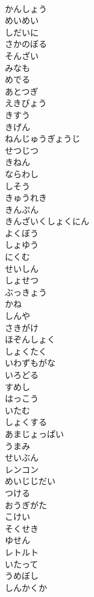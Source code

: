 \documentclass[8pt]{extreport}
\begin{document}
\begin{CJK}{UTF8}{min}
\\	かんしょう
\\	めいめい
\\	しだいに
\\	さかのぼる
\\	そんざい
\\	みなも
\\	めでる
\\	あとつぎ
\\	えきびょう
\\	きすう
\\	きげん
\\	ねんじゅうぎょうじ
\\	せつじつ
\\	きねん
\\	ならわし
\\	しそう
\\	きゅうれき
\\	きんぷん
\\	きんざいくしょくにん
\\	よくぼう
\\	しょゆう
\\	にくむ
\\	せいしん
\\	しょせつ
\\	ぶっきょう
\\	かね
\\	しんや
\\	さきがけ
\\	ほぞんしょく
\\	しょくたく
\\	いわずもがな
\\	いろどる
\\	すめし
\\	はっこう
\\	いたむ
\\	しょくする
\\	あまじょっぱい
\\	うまみ
\\	せいぶん
\\	レンコン
\\	めいじじだい
\\	つける
\\	おうぎがた
\\	こけい
\\	そくせき
\\	ゆせん
\\	レトルト
\\	いたって
\\	うめぼし
\\	しんかくか

\end{CJK}
\end{document}
